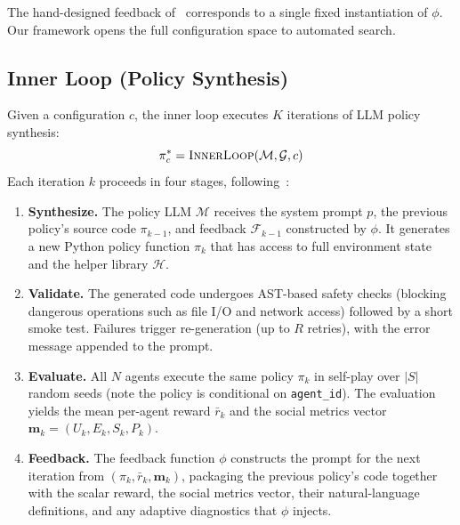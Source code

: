 \documentclass{article}
\newcommand{\cM}{\mathcal{M}}
\newcommand{\cG}{\mathcal{G}}
\newcommand{\bm}{\mathbf{m}}
\begin{document}
The hand-designed feedback of~\cite{gallego2026} corresponds to a single fixed instantiation of $\phi$. Our framework opens the full configuration space to automated search.

\subsection{Inner Loop (Policy Synthesis)}

Given a configuration $c$, the inner loop executes $K$ iterations of LLM policy synthesis:
\begin{equation}
  \pi^*_c = \textsc{InnerLoop}(\cM, \cG, c)
\end{equation}
Each iteration $k$ proceeds in four stages, following~\cite{gallego2026}:
\begin{enumerate}
  \item \textbf{Synthesize.} The policy LLM $\cM$ receives the system prompt $p$, the previous policy's source code $\pi_{k-1}$, and feedback $\mathcal{F}_{k-1}$ constructed by $\phi$. It generates a new Python policy function $\pi_k$ that has access to full environment state and the helper library $\mathcal{H}$.
  \item \textbf{Validate.} The generated code undergoes AST-based safety checks (blocking dangerous operations such as file I/O and network access) followed by a short smoke test. Failures trigger re-generation (up to $R$ retries), with the error message appended to the prompt.
  \item \textbf{Evaluate.} All $N$ agents execute the same policy $\pi_k$ in self-play over $|S|$ random seeds (note the policy is conditional on \texttt{agent\_id}). The evaluation yields the mean per-agent reward $\bar{r}_k$ and the social metrics vector $\bm_k = (U_k, E_k, S_k, P_k)$.
  \item \textbf{Feedback.} The feedback function $\phi$ constructs the prompt for the next iteration from $(\pi_k, \bar{r}_k, \bm_k)$, packaging the previous policy's code together with the scalar reward, the social metrics vector, their natural-language definitions, and any adaptive diagnostics that $\phi$ injects.
\end{enumerate}
\end{document}
